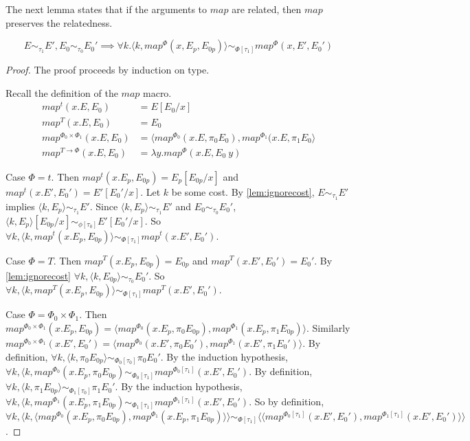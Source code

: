 The next lemma states that if the arguments to $map$ are related, then $map$ preserves the relatedness.
\begin{lemma}
  \label{lem:relatedmap}
  \[ E \sim_{\tau_1} E', E_0 \sim_{\tau_0} E_0' \implies \forall k. \langle k, map^\Phi(x, E_p, E_{0p})\rangle \sim_{\Phi[\tau_1]} map^\Phi(x, E', E_0') \]
\end{lemma}
\begin{proof}
  The proof proceeds by induction on type.

  Recall the definition of the $map$ macro.
  \begin{align*}
    map^t(x.E, E_0) &= E[E_0/x]                                                                                       \\
    map^T(x.E, E_0) &= E_0                                                                                            \\ 
    map^{\Phi_0 \times \Phi_1}(x.E, E_0) &= \langle map^{\Phi_0}(x.E, \pi_0 E_0), map^{\Phi_1}(x.E, \pi_1 E_0 \rangle \\
    map^{T \to \Phi}(x.E, E_0) &= \lambda y.map^\Phi(x.E, E_0\ y)
  \end{align*}

  Case $\Phi = t$.
  Then $map^t(x.E_p, E_{0p}) = E_p[E_{0p}/x]$ and $map^t(x.E', E_0') = E'[E_0'/x]$.
  Let $k$ be some cost.
  By \ref{lem:ignorecost}, $E \sim_{\tau_1} E'$ implies $\langle k, E_p \rangle \sim_{\tau_1} E'$.
  Since $\langle k, E_p \rangle \sim_{\tau_1} E'$ and $E_0 \sim_{\tau_0} E_0'$, $\langle k, E_p \rangle [E_{0p}/x] \sim_{\phi[\tau_0]} E'[E_0'/x]$.
  So $\forall k, \langle k, map^t(x.E_p, E_{0p}) \rangle \sim_{\Phi[\tau_1]} map^t(x.E', E_0')$.

  Case $\Phi = T$.
  Then $map^T(x.E_p, E_{0p}) = E_{0p}$ and $map^T(x.E', E_0') = E_0'$.
  By \ref{lem:ignorecost} $\forall k, \langle k, E_{0p} \rangle \sim_{\tau_0} E_0'$.
  So $\forall k, \langle k, map^T(x.E_p, E_{0p}) \rangle \sim_{\Phi[\tau_1]} map^T(x.E', E_0')$.

  Case $\Phi = \Phi_0 \times \Phi_1$.
  Then $map^{\Phi_0 \times \Phi_1}(x. E_p, E_{0p}) = \langle map^{\Phi_0}(x. E_p, \pi_0 E_{0p}), map^{\Phi_1}(x. E_p, \pi_1 E_{0p}) \rangle$.
  Similarly $map^{\Phi_0 \times \Phi_1}(x. E', E_0') = \langle map^{\Phi_0}(x. E', \pi_0 E_0'), map^{\Phi_1}(x. E', \pi_1 E_0') \rangle$.
  By definition, $\forall k, \langle k, \pi_0 E_{0p} \rangle \sim_{\Phi_0[\tau_0]} \pi_0 E_0'$.
  By the induction hypothesis, $\forall k, \langle k, map^{\Phi_0}(x. E_p, \pi_0 E_{0p}) \sim_{\Phi_0[\tau_1]} map^{\Phi_0[\tau_1]}(x. E', E_0')$.
  By definition, $\forall k, \langle k, \pi_1 E_{0p} \rangle \sim_{\Phi_1[\tau_0]} \pi_1 E_0'$.
  By the induction hypothesis, $\forall k, \langle k, map^{\Phi_1}(x. E_p, \pi_1 E_{0p}) \sim_{\Phi_1[\tau_1]} map^{\Phi_1[\tau_1]}(x. E', E_0')$.
  So by definition, $\forall k, \langle k, \langle map^{\Phi_0}(x. E_p, \pi_0 E_{0p}), map^{\Phi_1}(x. E_p, \pi_1 E_{0p}) \rangle \rangle \sim_{\Phi[\tau_1]} \langle \langle map^{\Phi_0[\tau_1]}(x. E', E_0'), map^{\Phi_1[\tau_1]}(x. E', E_0') \rangle \rangle$.


\end{proof}
